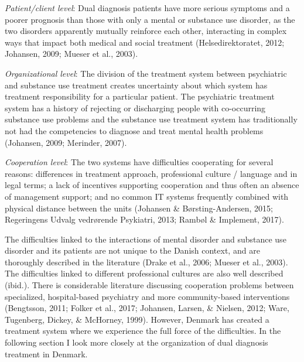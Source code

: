 \begin{multicols}{2}
\par
\textit{Patient/client level}: Dual diagnosis patients have more serious symptoms and a poorer prognosis than those with only a mental or substance use disorder, as the two disorders apparently mutually reinforce each other, interacting in complex ways that impact both medical and social treatment (Helsedirektoratet, 2012; Johansen, 2009; Mueser et al., 2003).
\par
\textit{Organizational level}: The division of the treatment system between psychiatric and substance use treatment creates uncertainty about which system has treatment responsibility for a particular patient. The psychiatric treatment system has a history of rejecting or discharging people with co-occurring substance use problems and the substance use treatment system has traditionally not had the competencies to diagnose and treat mental health problems (Johansen, 2009; Merinder, 2007).
\par
\textit{Cooperation level}: The two systems have difficulties cooperating for several reasons: differences in treatment approach, professional culture / language and in legal terms; a lack of incentives supporting cooperation and thus often an absence of management support; and no common IT systems frequently combined with physical distance between the units (Johansen \& Børsting-Andersen, 2015; Regeringens Udvalg vedrørende Psykiatri, 2013; Rambøl \& Implement, 2017).
\par
The difficulties linked to the interactions of mental disorder and substance use disorder and its patients are not unique to the Danish context, and are thoroughly described in the literature (Drake et al., 2006; Mueser et al., 2003). The difficulties linked to different professional cultures are also well described (ibid.). There is considerable literature discussing cooperation problems between specialized, hospital-based psychiatry and more community-based interventions (Bengtsson, 2011; Folker et al., 2017; Johansen, Larsen, \& Nielsen, 2012; Ware, Tugenberg, Dickey, \& McHorney, 1999).%
However, Denmark has created a treatment system where we experience the full force of the difficulties. In the following section I look more closely at the organization of dual diagnosis treatment in Denmark.


\end{multicols}
